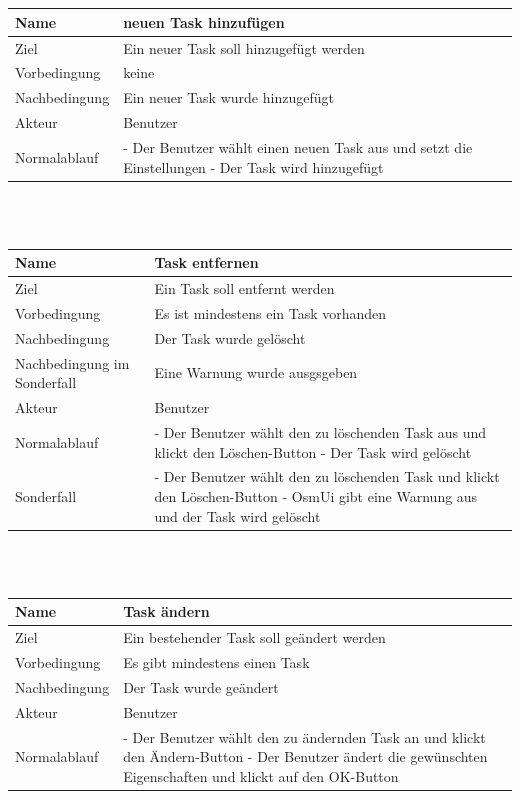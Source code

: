 \documentclass[a4paper,10pt]{scrartcl}
\begin{document}
\\
\\
\begin{tabular}{|p{5cm}|p{10cm}|}
\hline Name & neuen Task hinzufügen \\ 
\hline Ziel & Ein neuer Task soll hinzugefügt werden \\ 
\hline Vorbedingung & keine \\ 
\hline Nachbedingung & Ein neuer Task wurde hinzugefügt \\ 
\hline Akteur & Benutzer \\ 
\hline Normalablauf & - Der Benutzer wählt einen neuen Task aus und setzt die Einstellungen
\newline
- Der Task wird hinzugefügt
\\ 
\hline 
\end{tabular}
\\
\\
\begin{tabular}{|p{5cm}|p{10cm}|}
\hline Name & Task entfernen \\ 
\hline Ziel & Ein Task soll entfernt werden \\ 
\hline Vorbedingung & Es ist mindestens ein Task vorhanden \\ 
\hline Nachbedingung & Der Task wurde gelöscht \\ 
\hline Nachbedingung im Sonderfall & Eine Warnung wurde ausgsgeben \\ 
\hline Akteur & Benutzer \\ 
\hline Normalablauf & - Der Benutzer wählt den zu löschenden Task aus und klickt den Löschen-Button
\newline
- Der Task wird gelöscht
\\ 
\hline Sonderfall & - Der Benutzer wählt den zu löschenden Task und klickt den Löschen-Button
\newline
- OsmUi gibt eine Warnung aus und der Task wird gelöscht
 \\ 
\hline 
\end{tabular}  
\\
\\\begin{tabular}{|p{5cm}|p{10cm}|}
\hline Name & Task ändern \\ 
\hline Ziel & Ein bestehender Task soll geändert werden \\ 
\hline Vorbedingung & Es gibt mindestens einen Task \\ 
\hline Nachbedingung & Der Task wurde geändert \\  
\hline Akteur & Benutzer \\ 
\hline Normalablauf & - Der Benutzer wählt den zu ändernden Task an und klickt den Ändern-Button
\newline
- Der Benutzer ändert die gewünschten Eigenschaften und klickt auf den OK-Button
\\ 
\hline 
\end{tabular} 
\end{document}
